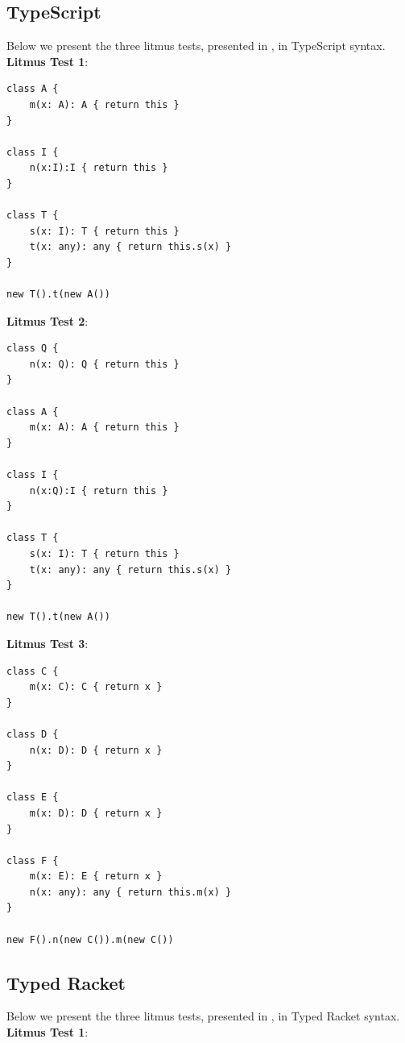 \documentclass[acmlarge, anonymous, authordraft, review]{acmart} %
\begin{document}
\subsection*{TypeScript}

Below we present the three litmus tests, presented in , in TypeScript syntax. \\

\noindent
\textbf{Litmus Test 1}:
\begin{lstlisting}
class A {
    m(x: A): A { return this }
}

class I {
    n(x:I):I { return this }
}

class T {
    s(x: I): T { return this }
    t(x: any): any { return this.s(x) }
}

new T().t(new A())
\end{lstlisting}

\noindent
\textbf{Litmus Test 2}:
\begin{lstlisting}
class Q {
    n(x: Q): Q { return this }
}

class A {
    m(x: A): A { return this }
}

class I {
    n(x:Q):I { return this }
}

class T {
    s(x: I): T { return this }
    t(x: any): any { return this.s(x) }
}

new T().t(new A())
\end{lstlisting}


\noindent
\textbf{Litmus Test 3}:
\begin{lstlisting}
class C {
    m(x: C): C { return x }
}

class D {
    n(x: D): D { return x }
}

class E {
    m(x: D): D { return x }
}

class F {
    m(x: E): E { return x }
    n(x: any): any { return this.m(x) }
}

new F().n(new C()).m(new C())
\end{lstlisting}




\subsection*{Typed Racket}

Below we present the three litmus tests, presented in , in Typed Racket syntax. \\

\noindent
\textbf{Litmus Test 1}:
\end{document}
